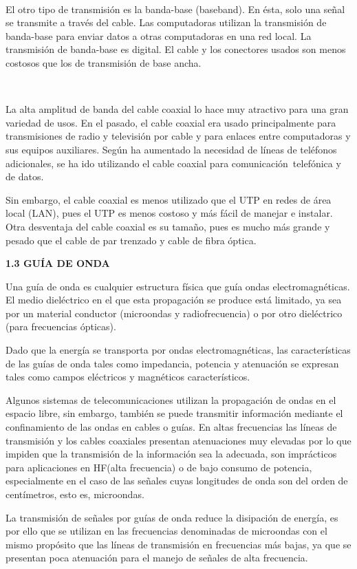 ~

El otro tipo de transmisión es la banda-base (baseband). En ésta, solo
una señal se transmite a través del cable. Las computadoras utilizan la
transmisión de banda-base para enviar datos a otras computadoras en una
red local. La transmisión de banda-base es digital. El cable y los
conectores usados son menos costosos que los de transmisión de base
ancha.

~

La alta amplitud de banda del cable coaxial lo hace muy atractivo para
una gran variedad de usos. En el pasado, el cable coaxial era usado
principalmente para transmisiones de radio y televisión por cable y para
enlaces entre computadoras y sus equipos auxiliares. Según ha aumentado
la necesidad de líneas de teléfonos adicionales, se ha ido utilizando el
cable coaxial para comunicación~telefónica y de datos.

Sin embargo, el cable coaxial es menos utilizado que el UTP en redes de
área local (LAN), pues el UTP es menos costoso y más fácil de manejar e
instalar. Otra desventaja del cable coaxial es su tamaño, pues es mucho
más grande y pesado que el cable de par trenzado y cable de fibra
óptica.

\textbf{1.3 GUÍA DE ONDA}

Una guía de onda es cualquier estructura física que guía ondas
electromagnéticas. El medio dieléctrico en el que esta propagación se
produce está limitado, ya sea por un material conductor (microondas y
radiofrecuencia) o por otro dieléctrico (para frecuencias ópticas).

Dado que la energía se transporta por ondas electromagnéticas, las
características de las guías de onda tales como impedancia, potencia y
atenuación se expresan tales como campos eléctricos y magnéticos
característicos.

Algunos sistemas de telecomunicaciones utilizan la propagación de ondas
en el espacio libre, sin embargo, también se puede transmitir
información mediante el confinamiento de las ondas en cables o guías. En
altas frecuencias las líneas de transmisión y los cables coaxiales
presentan atenuaciones muy elevadas por lo que impiden que la
transmisión de la información sea la adecuada, son imprácticos para
aplicaciones en HF(alta frecuencia) o de bajo consumo de potencia,
especialmente en el caso de las señales cuyas longitudes de onda son del
orden de centímetros, esto es, microondas.

La transmisión de señales por guías de onda reduce la disipación de
energía, es por ello que se utilizan en las frecuencias denominadas de
microondas con el mismo propósito que las líneas de transmisión en
frecuencias más bajas, ya que se presentan poca atenuación para el
manejo de señales de alta frecuencia.

